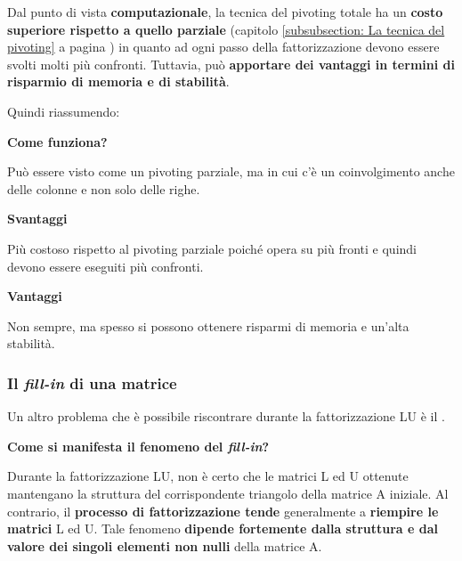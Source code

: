 \highspace
Dal punto di vista \textbf{computazionale}, la tecnica del pivoting totale ha un \textbf{costo superiore rispetto a quello parziale} (capitolo \ref{subsubsection: La tecnica del pivoting} a pagina \pageref{subsubsection: La tecnica del pivoting}) in quanto ad ogni passo della fattorizzazione devono essere svolti molti più confronti. Tuttavia, può \textbf{apportare dei vantaggi in termini di risparmio di memoria e di stabilità}.

\highspace
Quindi riassumendo:
\begin{flushleft}
    \textcolor{Green3}{ \textbf{Come funziona?}}
\end{flushleft}
Può essere visto come un pivoting parziale, ma in cui c'è un coinvolgimento anche delle colonne e non solo delle righe.

\begin{flushleft}
    \textcolor{Red2}{ \textbf{Svantaggi}}
\end{flushleft}
Più costoso rispetto al pivoting parziale poiché opera su più fronti e quindi devono essere eseguiti più confronti.

\begin{flushleft}
    \textcolor{Green3}{ \textbf{Vantaggi}}
\end{flushleft}
Non sempre, ma spesso si possono ottenere risparmi di memoria e un'alta stabilità.

\newpage

\subsubsection{Il \emph{fill-in} di una matrice}

Un altro problema che è possibile riscontrare durante la fattorizzazione LU è il .

\begin{flushleft}
    \textcolor{Green3}{ \textbf{Come si manifesta il fenomeno del \emph{fill-in}?}}
\end{flushleft}
Durante la fattorizzazione LU, non è certo che le matrici L ed U ottenute mantengano la struttura del corrispondente triangolo della matrice A iniziale. Al contrario, il \textbf{processo di fattorizzazione tende} generalmente a \textbf{riempire le matrici} L ed U. Tale fenomeno \textbf{dipende fortemente dalla struttura e dal valore dei singoli elementi non nulli} della matrice A.

